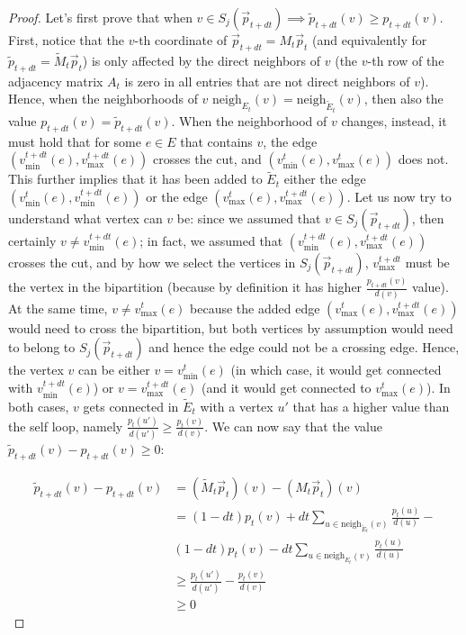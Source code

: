 \documentclass[../main.tex]{subfiles}
\begin{document}
\begin{proof}
    Let's first prove that when $v\in S_j(\vec{p}_{t+dt}) \implies \tilde{p}_{t+dt}(v) \geq p_{t+dt}(v)$. First, notice that the $v$-th coordinate of $\vec{p}_{t+dt} = M_t \vec{p}_t$ (and equivalently for $\tilde{p}_{t+dt} = \tilde{M}_t \vec{p}_t$) is only affected by the direct neighbors of $v$ (the $v$-th row of the adjacency matrix $A_t$ is zero in all entries that are not direct neighbors of $v$). Hence, when the neighborhoods of $v$ $\text{neigh}_{E_t}(v) = \text{neigh}_{\tilde{E}_t}(v)$, then also the value $p_{t+dt}(v) = \tilde{p}_{t+dt}(v)$. When the neighborhood of $v$ changes, instead, it must hold that for some $e \in E$ that contains $v$, the edge $(v_{\text{min}}^{t+dt}(e), v_{\text{max}}^{t+dt}(e))$ crosses the cut, and $(v_{\text{min}}^{t}(e), v_{\text{max}}^{t}(e))$ does not. This further implies that it has been added to $\tilde{E}_t$ either the edge $(v_{\text{min}}^{t}(e), v_{\text{min}}^{t+dt}(e))$ or the edge $(v_{\text{max}}^{t}(e), v_{\text{max}}^{t+dt}(e))$. Let us now try to understand what vertex can $v$ be: since we assumed that $v \in S_j(\vec{p}_{t+dt})$, then certainly $v \neq v_{\text{min}}^{t+dt}(e)$; in fact, we assumed that $(v_{\text{min}}^{t+dt}(e), v_{\text{max}}^{t+dt}(e))$ crosses the cut, and by how we select the vertices in $S_j(\vec{p}_{t+dt})$, $v_{\text{max}}^{t+dt}$ must be the vertex in the bipartition (because by definition it has higher $\frac{p_{t+dt}(v)}{d(v)}$ value). At the same time, $v \neq v_{\text{max}}^t(e)$ because the added edge $(v_{\text{max}}^t(e), v_{\text{max}}^{t+dt}(e))$ would need to cross the bipartition, but both vertices by assumption would need to belong to $S_j(\vec{p}_{t+dt})$ and hence the edge could not be a crossing edge. Hence, the vertex $v$ can be either $v = v_{\text{min}}^{t}(e)$ (in which case, it would get connected with $v_{\text{min}}^{t+dt}(e)$) or $v = v_{\text{max}}^{t+dt}(e)$ (and it would get connected to $v_{\text{max}}^{t}(e)$). In both cases, $v$ gets connected in $\tilde{E}_t$ with a vertex $u'$ that has a higher value than the self loop, namely $\frac{p_t(u')}{d(u')} \geq \frac{p_t(v)}{d(v)}$. We can now say that the value $\tilde{p}_{t+dt}(v) - p_{t+dt}(v) \geq 0$:
    
    \begin{align}
        \tilde{p}_{t+dt}(v) - p_{t+dt}(v) & = 
        (\tilde{M}_t \vec{p}_t)(v) - (M_t \vec{p}_t)(v) \\ & =
        \label{eq:ptilde_minus_pt}
         (1 - dt)p_t(v) + dt \sum_{u\in \text{neigh}_{\tilde{E}_t}(v)} \frac{p_t(u)}{d(u)} - \nonumber \\ & (1 - dt)p_t(v) - dt \sum_{u\in \text{neigh}_{E_t}(v)} \frac{p_t(u)}{d(u)} \\ & \geq
         \label{eq:ptilde_minus_pt_2}
         \frac{p_t(u')}{d(u')} - \frac{p_t(v)}{d(v)} \\ 
         & \geq 0
    \end{align}  
    

\end{proof}
\end{document}
